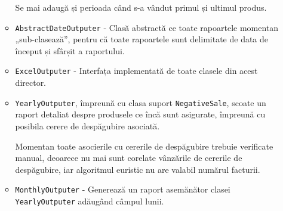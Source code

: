 \begin{itemize}
\begin{itemize}
			Se mai adaugă și perioada când s-a vândut primul și ultimul produs.
			\item \verb|AbstractDateOutputer| - Clasă abstractă ce toate rapoartele momentan „sub-clasează”, pentru că toate rapoartele sunt delimitate de data de început și sfârșit a raportului.
			\item \verb|ExcelOutputer| - Interfața implementată de toate clasele din acest director.
			\item \verb|YearlyOutputer|, împreună cu clasa suport \verb|NegativeSale|, scoate un raport detaliat despre produsele ce încă sunt asigurate, împreună cu posibila cerere de despăgubire asociată.

			Momentan toate asocierile cu cererile de despăgubire trebuie verificate manual, deoarece nu mai sunt corelate vânzările de cererile de despăgubire, iar algoritmul euristic nu are valabil numărul facturii.
			\item \verb|MonthlyOutputer| - Generează un raport asemănător clasei \verb|YearlyOutputer| adăugând câmpul lunii.
		\end{itemize}
	\end{itemize}
